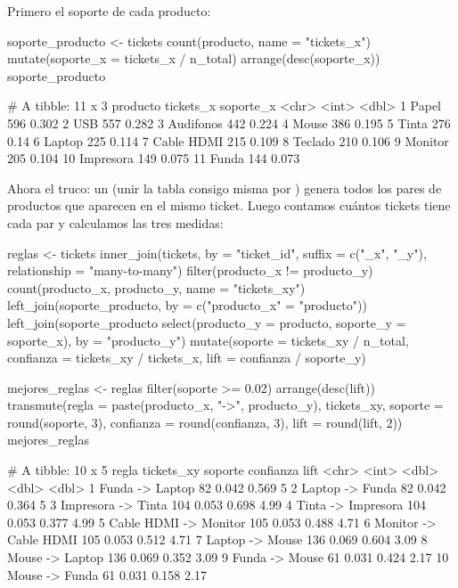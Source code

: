 Primero el soporte de cada producto:

\begin{rcode}
soporte_producto <- tickets %
  count(producto, name = "tickets_x") %
  mutate(soporte_x = tickets_x / n_total) %
  arrange(desc(soporte_x))
soporte_producto %
\end{rcode}

\begin{rsalida}
# A tibble: 11 x 3
   producto   tickets_x soporte_x
   <chr>          <int>     <dbl>
 1 Papel            596     0.302
 2 USB              557     0.282
 3 Audifonos        442     0.224
 4 Mouse            386     0.195
 5 Tinta            276     0.14 
 6 Laptop           225     0.114
 7 Cable HDMI       215     0.109
 8 Teclado          210     0.106
 9 Monitor          205     0.104
10 Impresora        149     0.075
11 Funda            144     0.073
\end{rsalida}

Ahora el truco: un  (unir la tabla consigo misma por
) genera todos los pares de productos que aparecen en el
mismo ticket. Luego contamos cuántos tickets tiene cada par y calculamos las
tres medidas:

\begin{rcode}
reglas <- tickets %
  inner_join(tickets, by = "ticket_id", suffix = c("_x", "_y"),
             relationship = "many-to-many") %
  filter(producto_x != producto_y) %
  count(producto_x, producto_y, name = "tickets_xy") %
  left_join(soporte_producto, by = c("producto_x" = "producto")) %
  left_join(soporte_producto %
              select(producto_y = producto, soporte_y = soporte_x),
            by = "producto_y") %
  mutate(soporte   = tickets_xy / n_total,
         confianza = tickets_xy / tickets_x,
         lift      = confianza / soporte_y)

mejores_reglas <- reglas %
  filter(soporte >= 0.02) %
  arrange(desc(lift)) %
  transmute(regla = paste(producto_x, "->", producto_y),
            tickets_xy, soporte = round(soporte, 3),
            confianza = round(confianza, 3), lift = round(lift, 2))
mejores_reglas %
\end{rcode}

\begin{rsalida}
# A tibble: 10 x 5
   regla                 tickets_xy soporte confianza  lift
   <chr>                      <int>   <dbl>     <dbl> <dbl>
 1 Funda -> Laptop               82   0.042     0.569  5   
 2 Laptop -> Funda               82   0.042     0.364  5   
 3 Impresora -> Tinta           104   0.053     0.698  4.99
 4 Tinta -> Impresora           104   0.053     0.377  4.99
 5 Cable HDMI -> Monitor        105   0.053     0.488  4.71
 6 Monitor -> Cable HDMI        105   0.053     0.512  4.71
 7 Laptop -> Mouse              136   0.069     0.604  3.09
 8 Mouse -> Laptop              136   0.069     0.352  3.09
 9 Funda -> Mouse                61   0.031     0.424  2.17
10 Mouse -> Funda                61   0.031     0.158  2.17
\end{rsalida}

